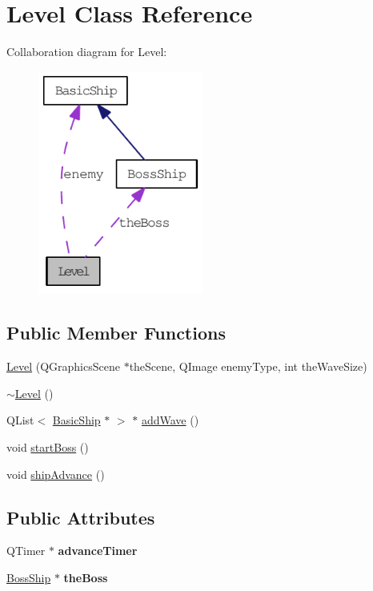 \hypertarget{class_level}{
\section{Level Class Reference}
\label{class_level}
}
Collaboration diagram for Level:\nopagebreak
\begin{figure}[H]
\begin{center}
\leavevmode
\includegraphics[width=154pt]{class_level__coll__graph}
\end{center}
\end{figure}
\subsection*{Public Member Functions}
\begin{DoxyCompactItemize}
\item 
\hyperlink{class_level_a5c64deb4b53abe03a9a31ff1d087aaf2}{Level} (QGraphicsScene $\ast$theScene, QImage enemyType, int theWaveSize)
\item 
\hyperlink{class_level_a249eac1e8f19ff44134efa5e986feaca}{$\sim$Level} ()
\item 
QList$<$ \hyperlink{class_basic_ship}{BasicShip} $\ast$ $>$ $\ast$ \hyperlink{class_level_a80431ecc50b0496e4fb11cda0b92905a}{addWave} ()
\item 
void \hyperlink{class_level_ae82e5c51006651333ba3ec36541ef12c}{startBoss} ()
\item 
void \hyperlink{class_level_ab15684c527719fa1568c3c0e90e71714}{shipAdvance} ()
\end{DoxyCompactItemize}
\subsection*{Public Attributes}
\begin{DoxyCompactItemize}
\item 
\hypertarget{class_level_a2a7c5c783f6c3b05dae215f7f5af5bac}{
QTimer $\ast$ {\bfseries advanceTimer}}
\label{class_level_a2a7c5c783f6c3b05dae215f7f5af5bac}

\item 
\hypertarget{class_level_a441c165d5ff1bfcf5fb02d363682f3f4}{
\hyperlink{class_boss_ship}{BossShip} $\ast$ {\bfseries theBoss}}
\label{class_level_a441c165d5ff1bfcf5fb02d363682f3f4}

\end{DoxyCompactItemize}
